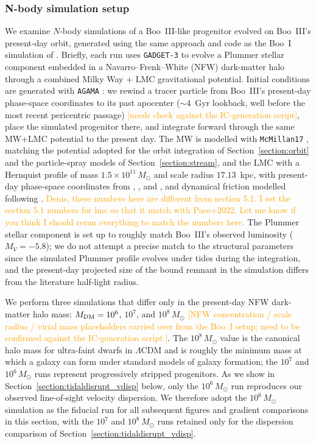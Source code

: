 \documentclass[twocolumn]{aastex631}
\newcommand{\fixme}{\textcolor{orange}}
\begin{document}
\subsubsection{N-body simulation setup}
We examine $N$-body simulations of a Boo~III-like progenitor evolved on Boo~III's present-day orbit, generated using the same approach and code as the Boo~I simulation of \citet{Sandford2025}. Briefly, each run uses \texttt{GADGET-3} \citep[an improved version of the \texttt{GADGET-2} code of][]{Springel2005} to evolve a Plummer stellar component embedded in a Navarro--Frenk--White (NFW) dark-matter halo through a combined Milky Way + LMC gravitational potential. Initial conditions are generated with \texttt{AGAMA} \citep{Vasiliev2019}: we rewind a tracer particle from Boo~III's present-day phase-space coordinates to its past apocenter ($\sim 4$~Gyr lookback, well before the most recent pericentric passage) \fixme{[needs check against the IC-generation script]}, place the simulated progenitor there, and integrate forward through the same MW+LMC potential to the present day. The MW is modelled with \texttt{McMillan17} \citep{McMillan2017}, matching the potential adopted for the orbit integration of Section~\ref{section:orbit} and the particle-spray models of Section~\ref{section:stream}, and the LMC with a Hernquist profile of mass $1.5\times10^{11}\,M_\odot$ and scale radius $17.13$~kpc, with present-day phase-space coordinates from \citet{Kallivayalil2013}, \citet{Pietrzynski2019}, and \citet{vandermarel2002}, and dynamical friction modelled following \citet{Jethwa2016}. \fixme{Denis, these numbers here are different from section 5.1. I set the section 5.1 numbers for lmc so that it match with 
Pace+2022. Let me know if you think I should rerun everything to match the numbers here.} The Plummer stellar component is set up to roughly match Boo~III's observed luminosity ($M_V = -5.8$); we do not attempt a precise match to the structural parameters since the simulated Plummer profile evolves under tides during the integration, and the present-day projected size of the bound remnant in the simulation differs from the literature half-light radius.

We perform three simulations that differ only in the present-day NFW dark-matter halo mass: $M_{\rm DM} = 10^6$, $10^7$, and $10^8\,M_\odot$ \fixme{[NFW concentration / scale radius / virial mass placeholders carried over from the Boo~I setup; need to be confirmed against the IC-generation script.]}. The $10^8\,M_\odot$ value is the canonical halo mass for ultra-faint dwarfs in $\Lambda$CDM \citep[e.g.,][]{Simon2019} and is roughly the minimum mass at which a galaxy can form under standard models of galaxy formation; the $10^7$ and $10^6\,M_\odot$ runs represent progressively stripped progenitors. As we show in Section~\ref{section:tidaldisrupt_vdisp} below, only the $10^6\,M_\odot$ run reproduces our observed line-of-sight velocity dispersion. We therefore adopt the $10^6\,M_\odot$ simulation as the fiducial run for all subsequent figures and gradient comparisons in this section, with the $10^7$ and $10^8\,M_\odot$ runs retained only for the dispersion comparison of Section~\ref{section:tidaldisrupt_vdisp}.
\end{document}
